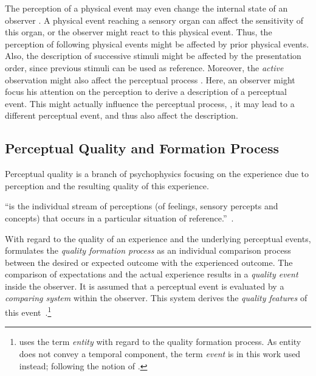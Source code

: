 The perception of a physical event may even change the internal state of an observer \citep{raake_quality_2014}.
A physical event reaching a sensory organ can affect the sensitivity of this organ, or the observer might react to this physical event.
Thus, the perception of following physical events might be affected by prior physical events.
Also, the description of successive stimuli might be affected by the presentation order, since previous stimuli can be used as reference.
Moreover, the \emph{active} observation might also affect the perceptual process \citep[][p.\,30]{raake_quality_2014}.
Here, an observer might focus his attention on the perception to derive a description of a perceptual event.
This might actually influence the perceptual process, \ie, it may lead to a different perceptual event, and thus also affect the description.


\subsection{Perceptual Quality and Formation Process}\label{related:perceivedQuality}
Perceptual quality is a branch of psychophysics focusing on the experience due to perception and the resulting quality of this experience.
\begin{definition}[Experiencing]
``is the individual stream of perceptions (of feelings, sensory percepts and concepts) that occurs in a particular situation of reference.''~\citep[p.\,13]{raake_quality_2014}.
\end{definition}

With regard to the quality of an experience and the underlying perceptual events, \citet{jekosch_voice_2005} formulates the \emph{quality formation process} as an individual comparison process between the desired or expected outcome with the experienced outcome.
The comparison of expectations and the actual experience results in a \emph{quality event} inside the observer.
It is assumed that a perceptual event is evaluated by a \emph{comparing system} within the observer.
This system derives the \emph{quality features} of this event~\citep[\cf{}][p.\,17]{jekosch_voice_2005}.\footnote{\citet{jekosch_voice_2005} uses the term \emph{entity} with regard to the quality formation process.
As entity does not convey a temporal component, the term \emph{event} is in this work used instead; following the notion of \citet{blauert_spatial_1996}.}

